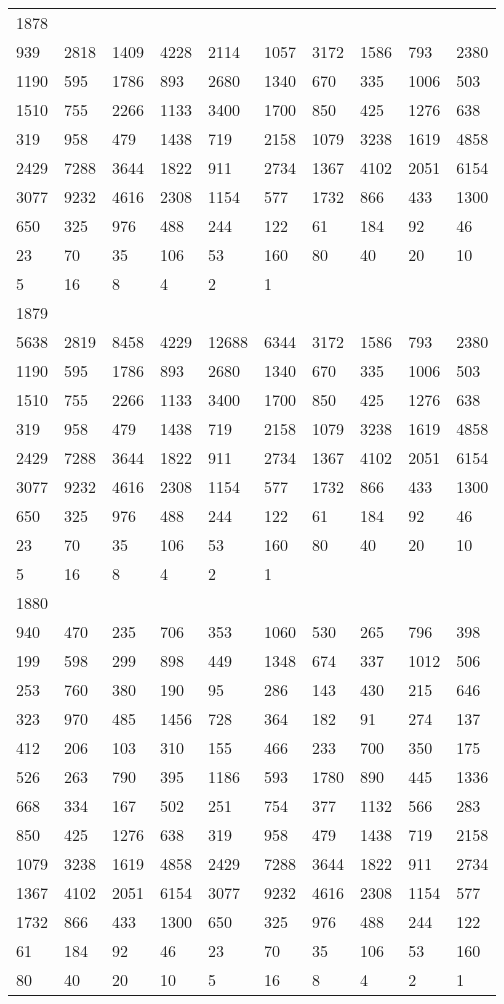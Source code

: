 \begin{longtable}{*{10}{l}}
1878&&&&&&&&&\\
939& 2818& 1409& 4228& 2114& 1057& 3172& 1586& 793& 2380\\
1190& 595& 1786& 893& 2680& 1340& 670& 335& 1006& 503\\
1510& 755& 2266& 1133& 3400& 1700& 850& 425& 1276& 638\\
319& 958& 479& 1438& 719& 2158& 1079& 3238& 1619& 4858\\
2429& 7288& 3644& 1822& 911& 2734& 1367& 4102& 2051& 6154\\
3077& 9232& 4616& 2308& 1154& 577& 1732& 866& 433& 1300\\
650& 325& 976& 488& 244& 122& 61& 184& 92& 46\\
23& 70& 35& 106& 53& 160& 80& 40& 20& 10\\
5& 16& 8& 4& 2& 1& \\

1879&&&&&&&&&\\
5638& 2819& 8458& 4229& 12688& 6344& 3172& 1586& 793& 2380\\
1190& 595& 1786& 893& 2680& 1340& 670& 335& 1006& 503\\
1510& 755& 2266& 1133& 3400& 1700& 850& 425& 1276& 638\\
319& 958& 479& 1438& 719& 2158& 1079& 3238& 1619& 4858\\
2429& 7288& 3644& 1822& 911& 2734& 1367& 4102& 2051& 6154\\
3077& 9232& 4616& 2308& 1154& 577& 1732& 866& 433& 1300\\
650& 325& 976& 488& 244& 122& 61& 184& 92& 46\\
23& 70& 35& 106& 53& 160& 80& 40& 20& 10\\
5& 16& 8& 4& 2& 1& \\

1880&&&&&&&&&\\
940& 470& 235& 706& 353& 1060& 530& 265& 796& 398\\
199& 598& 299& 898& 449& 1348& 674& 337& 1012& 506\\
253& 760& 380& 190& 95& 286& 143& 430& 215& 646\\
323& 970& 485& 1456& 728& 364& 182& 91& 274& 137\\
412& 206& 103& 310& 155& 466& 233& 700& 350& 175\\
526& 263& 790& 395& 1186& 593& 1780& 890& 445& 1336\\
668& 334& 167& 502& 251& 754& 377& 1132& 566& 283\\
850& 425& 1276& 638& 319& 958& 479& 1438& 719& 2158\\
1079& 3238& 1619& 4858& 2429& 7288& 3644& 1822& 911& 2734\\
1367& 4102& 2051& 6154& 3077& 9232& 4616& 2308& 1154& 577\\
1732& 866& 433& 1300& 650& 325& 976& 488& 244& 122\\
61& 184& 92& 46& 23& 70& 35& 106& 53& 160\\
80& 40& 20& 10& 5& 16& 8& 4& 2& 1\\


\end{longtable}
